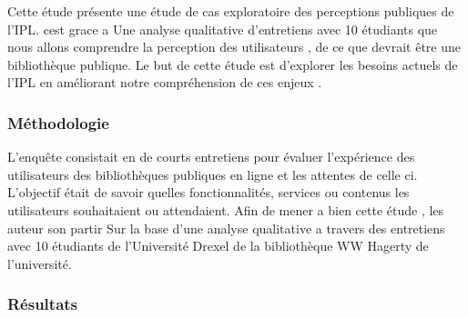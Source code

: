 \documentclass[french,a4paper,12pt]{article}
\begin{document}
\quad Cette étude présente une étude de cas exploratoire des perceptions publiques de l'IPL.  cest grace a Une analyse qualitative d'entretiens avec 10 étudiants que nous allons comprendre la perception des utilisateurs , de ce que devrait être une bibliothèque publique. Le but de cette étude est d'explorer les besoins actuels de l'IPL en améliorant notre compréhension de ces enjeux .

\subsubsection{ Méthodologie} 

\quad  L'enquête consistait en de courts entretiens pour évaluer l'expérience des utilisateurs des bibliothèques publiques en ligne et les attentes de celle ci. L'objectif était de savoir quelles fonctionnalités, services ou contenus les utilisateurs souhaitaient ou attendaient. Afin de mener a bien cette étude , les auteur son partir  Sur la base d'une analyse qualitative  a travers des entretiens avec 10 étudiants de  l'Université Drexel de la bibliothèque WW Hagerty de l'université.



\subsubsection{ Résultats} 
\end{document}
